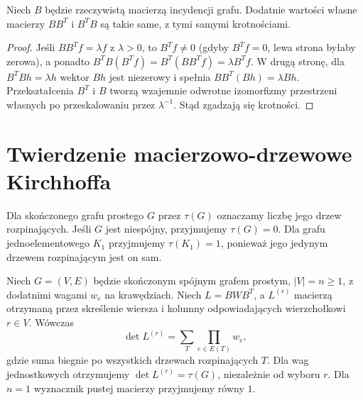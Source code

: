\begin{stwierdzenie}
Niech $B$ będzie rzeczywistą macierzą incydencji grafu.
Dodatnie wartości własne macierzy $BB^T$ i $B^TB$
są takie same, z tymi samymi krotnościami.
\end{stwierdzenie}

\begin{proof}
Jeśli $BB^Tf=\lambda f$ z $\lambda>0$, to
$B^Tf\ne0$ (gdyby $B^Tf=0$, lewa strona byłaby zerowa),
a ponadto
$B^TB(B^Tf)=B^T(BB^Tf)=\lambda B^Tf$.
W drugą stronę, dla $B^TBh=\lambda h$ wektor
$Bh$ jest niezerowy i spełnia
$BB^T(Bh)=\lambda Bh$.
Przekształcenia $B^T$ i $B$ tworzą wzajemnie odwrotne
izomorfizmy przestrzeni własnych po przeskalowaniu
przez $\lambda^{-1}$. Stąd zgadzają się krotności.
\end{proof}

\section{Twierdzenie macierzowo-drzewowe Kirchhoffa}
\label{sec:tg-matrix-tree}

\begin{definicja}
Dla skończonego grafu prostego $G$ przez $\tau(G)$
oznaczamy liczbę jego drzew rozpinających.
Jeśli $G$ jest niespójny, przyjmujemy $\tau(G)=0$.
Dla grafu jednoelementowego $K_1$ przyjmujemy
$\tau(K_1)=1$, ponieważ jego jedynym drzewem
rozpinającym jest on sam.
\end{definicja}

\begin{twierdzenie}
\label{thm:tg-kirchhoff}
Niech $G=(V,E)$ będzie skończonym spójnym grafem prostym,
$|V|=n\ge1$, z dodatnimi wagami $w_e$ na krawędziach.
Niech $L=BWB^T$, a $L^{(r)}$ macierzą otrzymaną
przez skreślenie wiersza i kolumny odpowiadających
wierzchołkowi $r\in V$. Wówczas
\[
\det L^{(r)}=\sum_{T}\prod_{e\in E(T)}w_e,
\]
gdzie suma biegnie po wszystkich drzewach rozpinających $T$.
Dla wag jednostkowych otrzymujemy
$\det L^{(r)}=\tau(G)$, niezależnie od wyboru $r$.
Dla $n=1$ wyznacznik pustej macierzy przyjmujemy równy $1$.
\end{twierdzenie}

